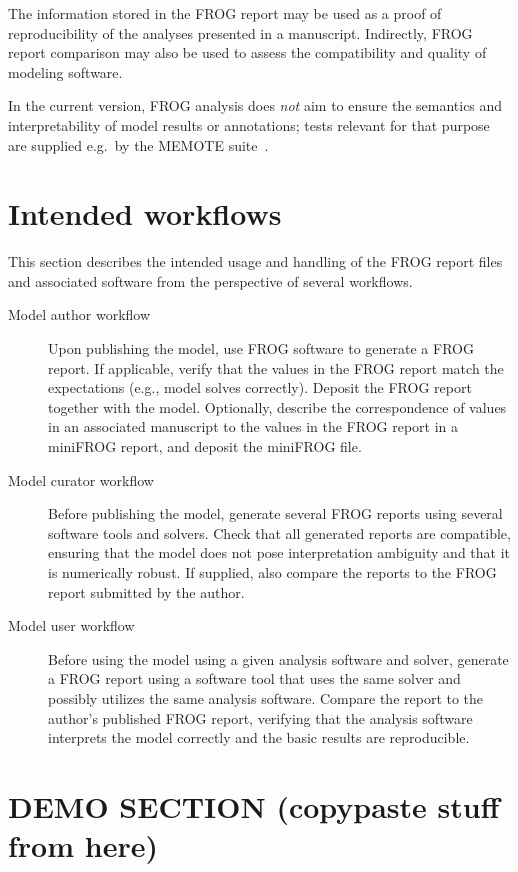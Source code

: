 The information stored in the FROG report may be used as a proof of reproducibility of the analyses presented in a manuscript. Indirectly, FROG report comparison may also be used to assess the compatibility and quality of modeling software.

In the current version, FROG analysis does \emph{not} aim to ensure the semantics and interpretability of model results or annotations; tests relevant for that purpose are supplied e.g.~by the MEMOTE suite~\cite{lieven2020memote}.

\section{Intended workflows}

This section describes the intended usage and handling of the FROG report files and associated software from the perspective of several workflows.

\begin{description}
\item[Model author workflow] Upon publishing the model, use FROG software to generate a FROG report. If applicable, verify that the values in the FROG report match the expectations (e.g., model solves correctly). Deposit the FROG report together with the model. Optionally, describe the correspondence of values in an associated manuscript to the values in the FROG report in a miniFROG report, and deposit the miniFROG file.
\item[Model curator workflow] Before publishing the model, generate several FROG reports using several software tools and solvers. Check that all generated reports are compatible, ensuring that the model does not pose interpretation ambiguity and that it is numerically robust. If supplied, also compare the reports to the FROG report submitted by the author.
\item[Model user workflow] Before using the model using a given analysis software and solver, generate a FROG report using a software tool that uses the same solver and possibly utilizes the same analysis software. Compare the report to the author's published FROG report, verifying that the analysis software interprets the model correctly and the basic results are reproducible.
\end{description}

\iffalse
\section{DEMO SECTION (copypaste stuff from here)}

